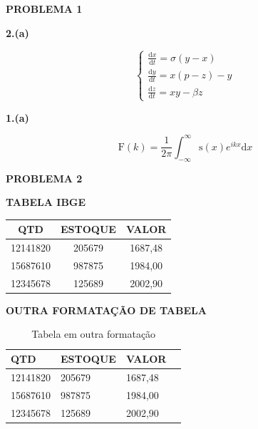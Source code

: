 \documentclass[12pt,oneside,openright,a4paper,english,brazil]{abntex2}
\begin{document}

\frenchspacing
\imprimircapa
\imprimirfolhaderosto

\centerline{\textbf{PROBLEMA 1}}
\par
\textbf{2.(a)}

\begin{equation}
    \begin{cases}
    \frac{\mathrm{d}x}{\mathrm{d}t}=\sigma(y-x)\\
    \frac{\mathrm{d}y}{\mathrm{d}t}=x(p-z)-y\\
    \frac{\mathrm{d}z}{\mathrm{d}t}=xy-\beta z
    \end{cases}
\end{equation}

\textbf{1.(a)}

\begin{equation}
    \mathrm{F}(k)=\frac{1}{2\pi}\int^\infty_{-\infty}\mathrm{s}(x)e^{ikx}\mathrm{d}x
\end{equation}


\clearpage
\centerline{\textbf{PROBLEMA 2}}

\textbf{TABELA IBGE}

\begin{table}[htb]
{ \begin{tabular}{ccc}
\toprule
QTD & ESTOQUE & VALOR \\
\midrule \midrule
12141820 & 205679 & 1687,48 \\
\midrule
15687610 & 987875 & 1984,00 \\
\midrule
12345678 & 125689 & 2002,90 \\
\bottomrule
\end{tabular} }
{  }
\end{table}

\textbf{OUTRA FORMATAÇÃO DE TABELA}
\begin{table}[htb]
\begin{center}
\ABNTEXfontereduzida
\caption[<como aparece na lista de tabelas>]{\label{tab:formal} Tabela em outra formatação}
\begin{tabular}{m{2.6cm}|m{4.0cm}|m{2.25cm}|m{3.40cm}}
\hline
\textbf{QTD} & \textbf{ESTOQUE} & \textbf{VALOR} \\ \hline
 12141820 & 205679 & 1687,48  \\
 \hline
 15687610 & 987875 & 1984,00 \\
 \hline
12345678 & 125689 & 2002,90\\
\hline
\end{tabular}
\end{center}
\end{table}
\end{document}
